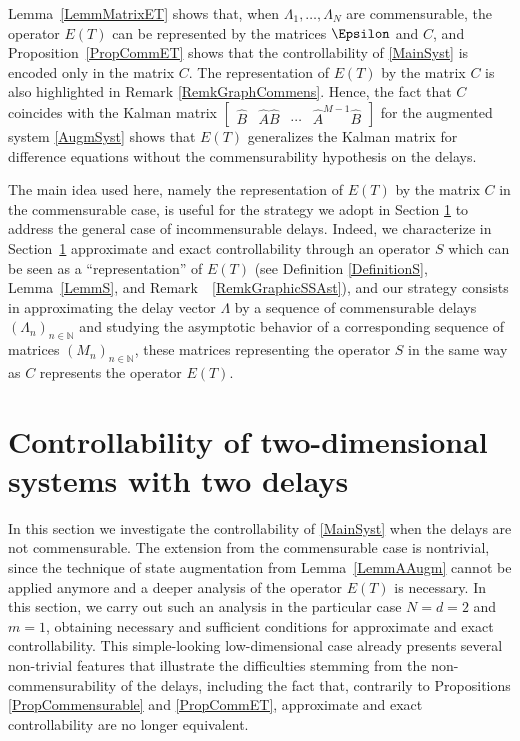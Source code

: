 \begin{remk}
Lemma~\ref{LemmMatrixET} shows that, when $\Lambda_1, \dots, \Lambda_N$ are commensurable, the operator $E(T)$ can be represented by the matrices $\Epsilon$ and $C$, and Proposition~\ref{PropCommET} shows that the controllability of \eqref{MainSyst} is encoded only in the matrix $C$. The representation of $E(T)$ by the matrix $C$ is also highlighted in Remark \ref{RemkGraphCommens}. Hence, the fact that $C$ coincides with the Kalman matrix $\begin{bmatrix}\widehat B & \widehat A \widehat B & \cdots & \widehat A^{M-1} \widehat B\end{bmatrix}$ for the augmented system \eqref{AugmSyst} shows that $E(T)$ generalizes the Kalman matrix for difference equations without the commensurability hypothesis on the delays.
\end{remk}

\begin{remk}
\label{RemkCn}
The main idea used here, namely the representation of $E(T)$ by the matrix $C$ in the commensurable case, is useful for the strategy we adopt in Section \ref{SecTwoTwo} to address the general case of incommensurable delays. Indeed, we characterize in Section~\ref{SecTwoTwo} approximate and exact controllability through an operator $S$ which can be seen as a ``representation'' of $E(T)$ (see Definition \ref{DefinitionS}, Lemma~\ref{LemmS}, and Remark~ \ref{RemkGraphicSSAst}), and our strategy consists in approximating the delay vector $\Lambda$ by a sequence of commensurable delays $(\Lambda_n)_{n \in \mathbb N}$ and studying the asymptotic behavior of a corresponding sequence of matrices $(M_n)_{n \in \mathbb N}$, these matrices representing the operator $S$ in the same way as $C$ represents the operator $E(T)$.
\end{remk}

\section{Controllability of two-dimensional systems with two delays}
\label{SecTwoTwo}

In this section we investigate the controllability of \eqref{MainSyst} when the delays are not commensurable. The extension from the commensurable case is nontrivial, since the technique of state augmentation from Lemma~\ref{LemmAAugm} cannot be applied anymore and a deeper analysis of the operator $E(T)$ is necessary. In this section, we carry out such an analysis in the particular case $N = d = 2$ and $m = 1$, obtaining necessary and sufficient conditions for approximate and exact controllability. This simple-looking low-dimensional case already presents several non-trivial features that illustrate the difficulties stemming from the non-commensurability of the delays, including the fact that, contrarily to Propositions \ref{PropCommensurable} and \ref{PropCommET}, approximate and exact controllability are no longer equivalent.

